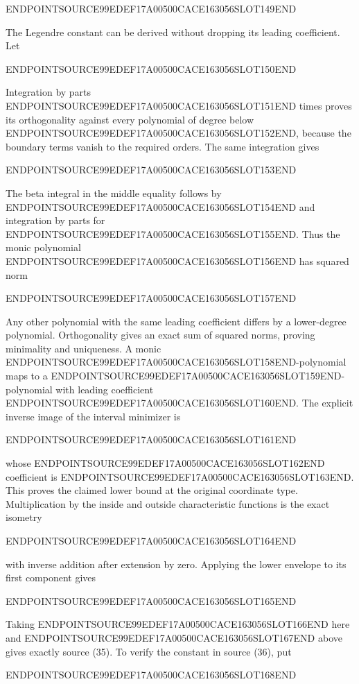 ENDPOINTSOURCE99EDEF17A00500CACE163056SLOT149END

The Legendre constant can be derived without dropping its leading coefficient. Let

ENDPOINTSOURCE99EDEF17A00500CACE163056SLOT150END

Integration by parts ENDPOINTSOURCE99EDEF17A00500CACE163056SLOT151END times proves its orthogonality against every polynomial of degree below ENDPOINTSOURCE99EDEF17A00500CACE163056SLOT152END, because the boundary terms vanish to the required orders. The same integration gives

ENDPOINTSOURCE99EDEF17A00500CACE163056SLOT153END

The beta integral in the middle equality follows by ENDPOINTSOURCE99EDEF17A00500CACE163056SLOT154END and integration by parts for ENDPOINTSOURCE99EDEF17A00500CACE163056SLOT155END. Thus the monic polynomial ENDPOINTSOURCE99EDEF17A00500CACE163056SLOT156END has squared norm

ENDPOINTSOURCE99EDEF17A00500CACE163056SLOT157END

Any other polynomial with the same leading coefficient differs by a lower-degree polynomial. Orthogonality gives an exact sum of squared norms, proving minimality and uniqueness. A monic ENDPOINTSOURCE99EDEF17A00500CACE163056SLOT158END-polynomial maps to a ENDPOINTSOURCE99EDEF17A00500CACE163056SLOT159END-polynomial with leading coefficient ENDPOINTSOURCE99EDEF17A00500CACE163056SLOT160END. The explicit inverse image of the interval minimizer is

ENDPOINTSOURCE99EDEF17A00500CACE163056SLOT161END

whose ENDPOINTSOURCE99EDEF17A00500CACE163056SLOT162END coefficient is ENDPOINTSOURCE99EDEF17A00500CACE163056SLOT163END. This proves the claimed lower bound at the original coordinate type. Multiplication by the inside and outside characteristic functions is the exact isometry

ENDPOINTSOURCE99EDEF17A00500CACE163056SLOT164END

with inverse addition after extension by zero. Applying the lower envelope to its first component gives

ENDPOINTSOURCE99EDEF17A00500CACE163056SLOT165END

Taking ENDPOINTSOURCE99EDEF17A00500CACE163056SLOT166END here and ENDPOINTSOURCE99EDEF17A00500CACE163056SLOT167END above gives exactly source (35). To verify the constant in source (36), put

ENDPOINTSOURCE99EDEF17A00500CACE163056SLOT168END

